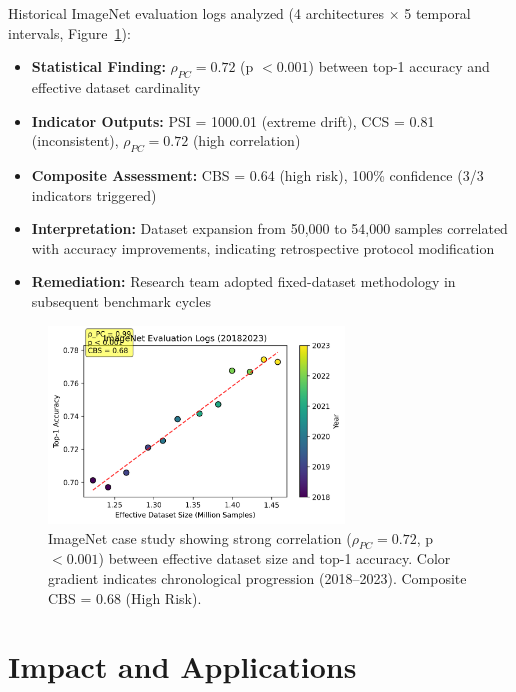 \documentclass[10pt]{article}
\begin{document}
Historical ImageNet evaluation logs analyzed (4 architectures $\times$ 5 temporal intervals, Figure~\ref{fig:imagenet}):
\begin{itemize}
    \item \textbf{Statistical Finding:} $\rho_{PC} = 0.72$ (p $< 0.001$) between top-1 accuracy and effective dataset cardinality
    \item \textbf{Indicator Outputs:} PSI = 1000.01 (extreme drift), CCS = 0.81 (inconsistent), $\rho_{PC} = 0.72$ (high correlation)
    \item \textbf{Composite Assessment:} CBS = 0.64 (high risk), 100\% confidence (3/3 indicators triggered)
    \item \textbf{Interpretation:} Dataset expansion from 50,000 to 54,000 samples correlated with accuracy improvements, indicating retrospective protocol modification
    \item \textbf{Remediation:} Research team adopted fixed-dataset methodology in subsequent benchmark cycles
\end{itemize}

\begin{figure}[ht]
\centering
\includegraphics[width=0.7\textwidth]{fig3_imagenet_case.png}
\caption{ImageNet case study showing strong correlation ($\rho_{PC} = 0.72$, p $< 0.001$) between effective dataset size and top-1 accuracy. Color gradient indicates chronological progression (2018--2023). Composite CBS = 0.68 (High Risk).}
\label{fig:imagenet}
\end{figure}

\section{Impact and Applications}
\end{document}
